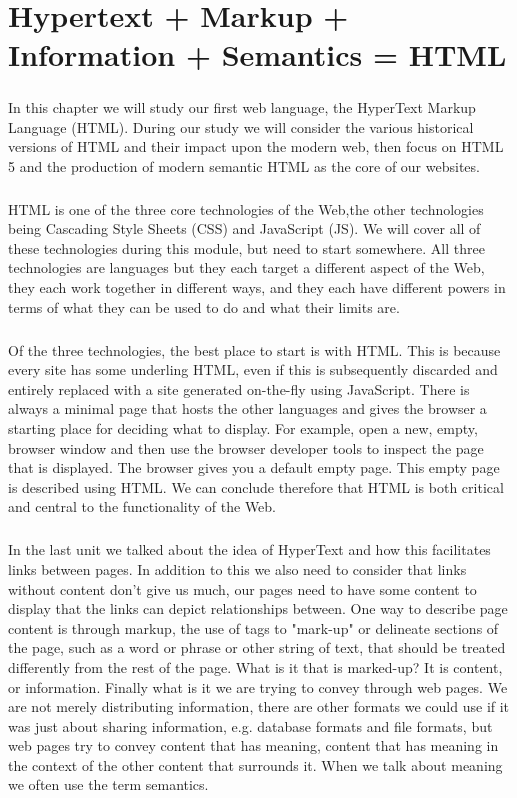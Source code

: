 \chapter{Hypertext + Markup + Information + Semantics = HTML}
\label{html}
\paragraph{} In this chapter we will study our first web language, the HyperText Markup Language (HTML). During our study we will consider the various historical versions of HTML and their impact upon the modern web, then focus on HTML 5 and the production of modern semantic HTML as the core of our websites.
\paragraph{} HTML is one of the three core technologies of the Web,the other technologies being Cascading Style Sheets (CSS) and JavaScript (JS). We will cover all of these technologies during this module, but need to start somewhere. All three technologies are languages but they each target a different aspect of the Web, they each work together in different ways, and they each have different powers in terms of what they can be used to do and what their limits are.
\paragraph{} Of the three technologies, the best place to start is with HTML. This is because every site has some underling HTML, even if this is subsequently discarded and entirely replaced with a site generated on-the-fly using JavaScript. There is always a minimal page that hosts the other languages and gives the browser a starting place for deciding what to display. For example, open a new, empty, browser window and then use the browser developer tools to inspect the page that is displayed. The browser gives you a default empty page. This empty page is described using HTML. We can conclude therefore that HTML is both critical and central to the functionality of the Web.
\paragraph{} In the last unit we talked about the idea of HyperText and how this facilitates links between pages. In addition to this we also need to consider that links without content don't give us much, our pages need to have some content to display that the links can depict relationships between. One way to describe page content is through markup, the use of tags to "mark-up" or delineate sections of the page, such as a word or phrase or other string of text, that should be treated differently from the rest of the page. What is it that is marked-up? It is content, or information. Finally what is it we are trying to convey through web pages. We are not merely distributing information, there are other formats we could use if it was just about sharing information, e.g. database formats and file formats, but web pages try to convey content that has meaning, content that has meaning in the context of the other content that surrounds it. When we talk about meaning we often use the term semantics. 
